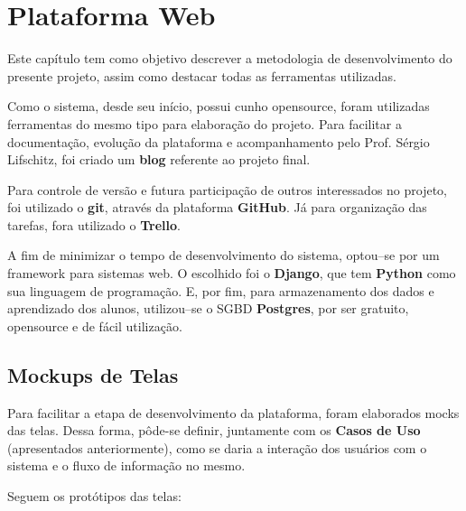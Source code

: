 \documentclass[graduacao,brazil]{ThesisPUC}
\begin{document}
\chapter{Plataforma Web}

Este cap\'{i}tulo tem como objetivo descrever a metodologia de desenvolvimento do presente projeto,
assim como destacar todas as ferramentas utilizadas.

Como o sistema, desde seu in\'{i}cio, possui cunho opensource, foram utilizadas ferramentas do mesmo
tipo para elabora\c{c}\~{a}o do projeto. Para facilitar a documenta\c{c}\~{a}o, evolu\c{c}\~{a}o da plataforma e
acompanhamento pelo Prof. S\'{e}rgio Lifschitz, foi criado um \textbf{blog} referente ao projeto final.

Para controle de vers\~{a}o e futura participa\c{c}\~{a}o de outros interessados no projeto, foi utilizado
o \textbf{git}, atrav\'{e}s da plataforma \textbf{GitHub}. J\'{a} para organiza\c{c}\~{a}o das tarefas, fora
utilizado o \textbf{Trello}.

A fim de minimizar o tempo de desenvolvimento do sistema, optou--se por um framework para sistemas web.
O escolhido foi o \textbf{Django}, que tem \textbf{Python} como sua linguagem de programa\c{c}\~{a}o.
E, por fim, para armazenamento dos dados e aprendizado dos alunos, utilizou--se o SGBD \textbf{Postgres},
por ser gratuito, opensource e de f\'{a}cil utiliza\c{c}\~{a}o.


\section{Mockups de Telas}

Para facilitar a etapa de desenvolvimento da plataforma, foram elaborados mocks das telas.
Dessa forma, p\^{o}de-se definir, juntamente com os \textbf{Casos de Uso} (apresentados anteriormente), como
se daria a intera\c{c}\~{a}o dos usu\'{a}rios com o sistema e o fluxo de informa\c{c}\~{a}o no
mesmo.

Seguem os prot\'{o}tipos das telas:
\end{document}
